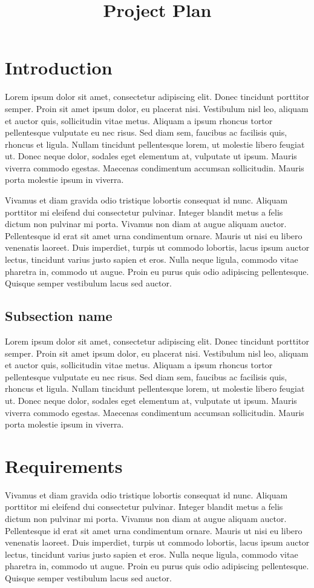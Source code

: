 \documentclass[10pt,a4paper]{article}
\begin{document}
\title{Project Plan}
\author{} %
\date{} %
\maketitle

\section{Introduction}
Lorem ipsum dolor sit amet, consectetur adipiscing elit. Donec tincidunt
porttitor semper. Proin sit amet ipsum dolor, eu placerat nisi. Vestibulum nisl
leo, aliquam et auctor quis, sollicitudin vitae metus. Aliquam a ipsum rhoncus
tortor pellentesque vulputate eu nec risus. Sed diam sem, faucibus ac facilisis
quis, rhoncus et ligula. Nullam tincidunt pellentesque lorem, ut molestie
libero feugiat ut. Donec neque dolor, sodales eget elementum at, vulputate ut
ipsum. Mauris viverra commodo egestas. Maecenas condimentum accumsan
sollicitudin. Mauris porta molestie ipsum in viverra.

Vivamus et diam gravida odio tristique lobortis consequat id nunc. Aliquam
porttitor mi eleifend dui consectetur pulvinar. Integer blandit metus a felis
dictum non pulvinar mi porta. Vivamus non diam at augue aliquam auctor.
Pellentesque id erat sit amet urna condimentum ornare. Mauris ut nisi eu libero
venenatis laoreet. Duis imperdiet, turpis ut commodo lobortis, lacus ipsum
auctor lectus, tincidunt varius justo sapien et eros. Nulla neque ligula,
commodo vitae pharetra in, commodo ut augue. Proin eu purus quis odio
adipiscing pellentesque. Quisque semper vestibulum lacus sed auctor.

\subsection{Subsection name}
Lorem ipsum dolor sit amet, consectetur adipiscing elit. Donec tincidunt
porttitor semper. Proin sit amet ipsum dolor, eu placerat nisi. Vestibulum nisl
leo, aliquam et auctor quis, sollicitudin vitae metus. Aliquam a ipsum rhoncus
tortor pellentesque vulputate eu nec risus. Sed diam sem, faucibus ac facilisis
quis, rhoncus et ligula. Nullam tincidunt pellentesque lorem, ut molestie
libero feugiat ut. Donec neque dolor, sodales eget elementum at, vulputate ut
ipsum. Mauris viverra commodo egestas. Maecenas condimentum accumsan
sollicitudin. Mauris porta molestie ipsum in viverra.


\section{Requirements}
Vivamus et diam gravida odio tristique lobortis consequat id nunc. Aliquam
porttitor mi eleifend dui consectetur pulvinar. Integer blandit metus a felis
dictum non pulvinar mi porta. Vivamus non diam at augue aliquam auctor.
Pellentesque id erat sit amet urna condimentum ornare. Mauris ut nisi eu libero
venenatis laoreet. Duis imperdiet, turpis ut commodo lobortis, lacus ipsum
auctor lectus, tincidunt varius justo sapien et eros. Nulla neque ligula,
commodo vitae pharetra in, commodo ut augue. Proin eu purus quis odio
adipiscing pellentesque. Quisque semper vestibulum lacus sed auctor.
\end{document}
